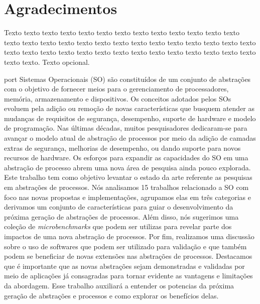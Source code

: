 \chapter*{Agradecimentos}

Texto texto texto texto texto texto texto texto texto texto texto texto texto
texto texto texto texto texto texto texto texto texto texto texto texto texto
texto texto texto texto texto texto texto texto texto texto texto texto texto
texto texto texto texto. Texto opcional.

\begin{resumo}{port}
Sistemas Operacionais (SO) são constituídos de um conjunto de abstrações com o
objetivo de fornecer meios para o gerenciamento de processadores, memória,
armazenamento e dispositivos. Os conceitos adotados pelos SOs evoluem pela
adição ou remoção de novas características que busquem atender as mudanças de
requisitos de segurança, desempenho, suporte de hardware e modelo de
programação. Nas últimas décadas, muitos pesquisadores dedicaram-se para
avançar o modelo atual de abstração de processos por meio da adição de camadas
extras de segurança, melhorias de desempenho, ou dando suporte para novos
recursos de hardware. Os esforços para expandir as capacidades do SO em uma
abstração de processo abrem uma nova área de pesquisa ainda pouco explorada.
Este trabalho tem como objetivo levantar o estado da arte referente as
pesquisas em abstrações de processos. Nós analisamos 15 trabalhos relacionado a
SO com foco nas novas propostas e implementações, agrupamos elas em três
categorias e derivamos um conjunto de características para guiar o
desenvolvimento da próxima geração de abstrações de processos. Além disso, nós
sugerimos uma coleção de \emph{microbenchmarks} que podem ser utilizas para
revelar parte dos impactos de uma nova abstração de processos. Por fim,
realizamos uma discussão sobre o uso de softwares que podem ser utilizado para
validação e que também podem se beneficiar de novas extensões nas abstrações de
processos.  Destacamos que é importante que as novas abstrações sejam
demonstradas e validadas por meio de aplicações já consagradas para tornar
evidente as vantagens e limitações da abordagem. Esse trabalho auxiliará a
entender os potencias da próxima geração de abstrações e processos e como
explorar os benefícios delas.
\end{resumo}


